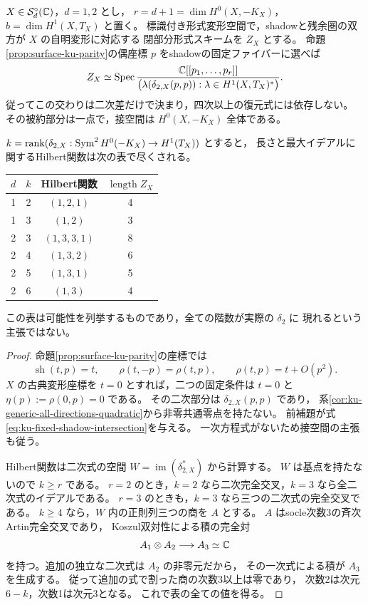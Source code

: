\begin{theorem}[残余圏とshadowを同時に固定する変形]
\label{thm:ku-fixed-shadow-intersection}
$X\in\mathcal S_d^\circ(\mathbb C)$，$d=1,2$ とし，
$r=d+1=\dim H^0(X,-K_X)$，$b=\dim H^1(X,T_X)$ と置く。
標識付き形式変形空間で，shadowと残余圏の双方が $X$ の自明変形に対応する
閉部分形式スキームを $Z_X$ とする。
命題\ref{prop:surface-ku-parity}の偶座標 $p$ をshadowの固定ファイバーに選べば
\begin{equation}\label{eq:ku-fixed-shadow-intersection}
 Z_X\simeq\operatorname{Spec}\frac{\mathbb C[[p_1,\ldots,p_r]]}
 {\bigl(\lambda(\delta_{2,X}(p,p)):
                      \lambda\in H^1(X,T_X)^*\bigr)}.
\end{equation}
従ってこの交わりは二次差だけで決まり，四次以上の復元式には依存しない。
その被約部分は一点で，接空間は $H^0(X,-K_X)$ 全体である。

$k=\operatorname{rank}(\delta_{2,X}:\operatorname{Sym}^2H^0(-K_X)\to H^1(T_X))$ とすると，
長さと最大イデアルに関するHilbert関数は次の表で尽くされる。
\begin{center}
\begin{tabular}{cccc}
\toprule
$d$ & $k$ & Hilbert関数 & $\operatorname{length}Z_X$\\
\midrule
1 & 2 & $(1,2,1)$ & 4\\
1 & 3 & $(1,2)$ & 3\\
2 & 3 & $(1,3,3,1)$ & 8\\
2 & 4 & $(1,3,2)$ & 6\\
2 & 5 & $(1,3,1)$ & 5\\
2 & 6 & $(1,3)$ & 4\\
\bottomrule
\end{tabular}
\end{center}
この表は可能性を列挙するものであり，全ての階数が実際の $\delta_2$ に
現れるという主張ではない。
\end{theorem}
\begin{proof}
命題\ref{prop:surface-ku-parity}の座標では
\[
 \operatorname{sh}(t,p)=t,\qquad
 \rho(t,-p)=\rho(t,p),\qquad
 \rho(t,p)=t+O(p^2).
\]
$X$ の古典変形座標を $t=0$ とすれば，二つの固定条件は
$t=0$ と $\eta(p):=\rho(0,p)=0$ である。
その二次部分は $\delta_{2,X}(p,p)$ であり，
系\ref{cor:ku-generic-all-directions-quadratic}から非零共通零点を持たない。
前補題が式\eqref{eq:ku-fixed-shadow-intersection}を与える。
一次方程式がないため接空間の主張も従う。

Hilbert関数は二次式の空間 $W=\operatorname{im}(\delta_{2,X}^*)$ から計算する。
$W$ は基点を持たないので $k\ge r$ である。
$r=2$ のとき，$k=2$ なら二次完全交叉，$k=3$ なら全二次式のイデアルである。
$r=3$ のときも，$k=3$ なら三つの二次式の完全交叉である。
$k\ge4$ なら，$W$ 内の正則列三つの商を $A$ とする。
$A$ はsocle次数3の斉次Artin完全交叉であり，
Koszul双対性による積の完全対
\[
 A_1\otimes A_2\longrightarrow A_3\simeq\mathbb C
\]
を持つ。追加の独立な二次式は $A_2$ の非零元だから，
その一次式による積が $A_3$ を生成する。
従って追加の式で割った商の次数3以上は零であり，
次数2は次元 $6-k$，次数1は次元3となる。
これで表の全ての値を得る。
\end{proof}


